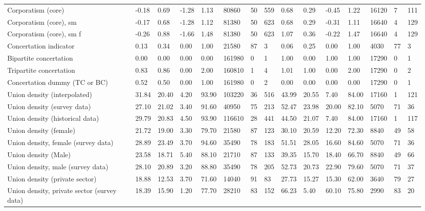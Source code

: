 \begin{longtable}{lllllllllllllll}
Corporatism (core) & -0.18 & 0.69 & -1.28 & 1.13 & 80860 & 50 & 559 & 0.68 & 0.29 & -0.45 & 1.22 & 16120 & 7 & 111\\
\addlinespace
Corporatism (core), sm & -0.17 & 0.68 & -1.28 & 1.12 & 81380 & 50 & 623 & 0.68 & 0.29 & -0.31 & 1.11 & 16640 & 4 & 129\\
Corporatism (core), sm f & -0.26 & 0.88 & -1.66 & 1.48 & 81380 & 50 & 623 & 1.07 & 0.36 & -0.22 & 1.47 & 16640 & 4 & 129\\
Concertation indicator & 0.13 & 0.34 & 0.00 & 1.00 & 21580 & 87 & 3 & 0.06 & 0.25 & 0.00 & 1.00 & 4030 & 77 & 3\\
Bipartite concertation & 0.00 & 0.00 & 0.00 & 0.00 & 161980 & 0 & 1 & 1.00 & 0.00 & 1.00 & 1.00 & 17290 & 0 & 1\\
Tripartite concertation & 0.83 & 0.86 & 0.00 & 2.00 & 160810 & 1 & 4 & 1.01 & 1.00 & 0.00 & 2.00 & 17290 & 0 & 2\\
\addlinespace
Concertation dummy (TC or BC) & 0.52 & 0.50 & 0.00 & 1.00 & 161980 & 0 & 2 & 0.00 & 0.00 & 0.00 & 0.00 & 17290 & 0 & 1\\
Union density (interpolated) & 31.84 & 20.40 & 4.20 & 93.90 & 103220 & 36 & 516 & 43.99 & 20.55 & 7.40 & 84.00 & 17160 & 1 & 121\\
Union density (survey data) & 27.10 & 21.02 & 3.40 & 91.60 & 40950 & 75 & 213 & 52.47 & 23.98 & 20.00 & 82.10 & 5070 & 71 & 36\\
Union density (historical data) & 29.79 & 20.83 & 4.50 & 93.90 & 116610 & 28 & 441 & 44.50 & 21.07 & 7.40 & 84.00 & 17160 & 1 & 117\\
Union density (female) & 21.72 & 19.00 & 3.30 & 79.70 & 21580 & 87 & 123 & 30.10 & 20.59 & 12.20 & 72.30 & 8840 & 49 & 58\\
\addlinespace
Union density, female (survey data) & 28.89 & 23.49 & 3.70 & 94.60 & 35490 & 78 & 183 & 51.51 & 28.05 & 16.60 & 84.60 & 5070 & 71 & 36\\
Union density (Male) & 23.58 & 18.71 & 5.40 & 88.10 & 21710 & 87 & 133 & 39.35 & 15.70 & 18.40 & 66.70 & 8840 & 49 & 66\\
Union density, male (survey data) & 28.10 & 20.89 & 3.20 & 88.80 & 35490 & 78 & 205 & 52.73 & 20.73 & 22.90 & 79.60 & 5070 & 71 & 37\\
Union density (private sector) & 18.88 & 12.53 & 3.70 & 71.60 & 14040 & 91 & 83 & 27.73 & 15.27 & 15.30 & 62.00 & 3640 & 79 & 27\\
Union density, private sector (survey data) & 18.39 & 15.90 & 1.20 & 77.70 & 28210 & 83 & 152 & 66.23 & 5.40 & 60.10 & 75.80 & 2990 & 83 & 20\\

\end{longtable}
